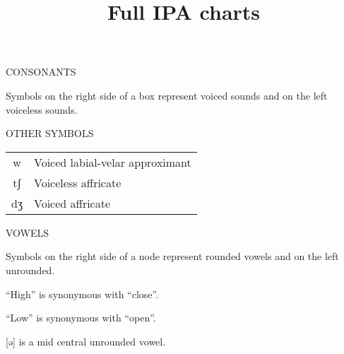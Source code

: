 \documentclass{article}
\title{Full IPA charts}
\date{}
\newcommand{\headspace}{0.4cm}
\begin{document}
  \maketitle
  CONSONANTS

  \vspace{\headspace}

  \begin{adjustbox}{width=\textwidth}
    
  \end{adjustbox}

  {\tiny *Symbols on the right side of a box represent voiced sounds and on the left voiceless sounds.}

  \vspace{2cm}

  \parbox[l]{0.5\textwidth}{
    OTHER SYMBOLS

    \vspace{\headspace}

    \begin{adjustbox}{width=0.3\textwidth}
      \begin{tabular}{c l}
        w  & Voiced labial-velar approximant \\
        tʃ & Voiceless affricate \\
        dʒ & Voiced affricate
      \end{tabular}
    \end{adjustbox}
  }
  \parbox[r]{0.5\textwidth}{
    VOWELS

    \vspace{\headspace}

    \begin{adjustbox}{width=0.4\textwidth}
      
    \end{adjustbox}
  }

  \begin{flushright}
    {\tiny
      Symbols on the right side of a node represent rounded vowels and on the left unrounded.

      ``High'' is synonymous with ``close''.

      ``Low'' is synonymous with ``open''.

      {[}ə] is a mid central unrounded vowel.
    }
  \end{flushright}

  {\small
    
  }
\end{document}
